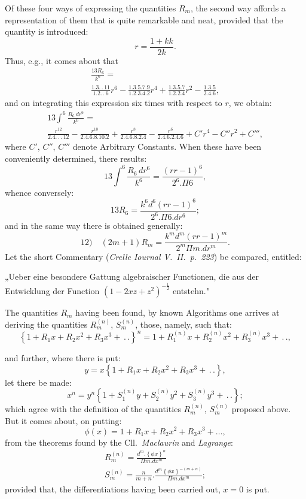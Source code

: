\documentclass{article}
\begin{document}
Of these four ways of expressing the quantities $R_{m}$, the second way affords a representation of them that is quite remarkable and neat, provided that the quantity is introduced:
\[
r=\frac{1+kk}{2k}.
\]
Thus, e.g., it comes about that
\[
\begin{gathered}
\frac{13R_{6}}{k^{6}}=\\[1.5ex]
\frac{1.3.\,.\,11}{1.2.\,.\,6}r^{6}-\frac{1.3.5.7.9}{1.2.3.4.2}r^{4}+\frac{1.3.5.7}{1.2.2.4}r^{2}-\frac{1.3.5}{2.4.6},
\end{gathered}
\]
and on integrating this expression six times with respect to $r$, we obtain:
\[
\begin{gathered}
13\int^{6}\frac{R_{6}\,dr^{6}}{k^{6}}=\\[1.5ex]
\frac{r^{12}}{2.4.\,.\,.\,12}-\frac{r^{10}}{2.4.6.8.10.2}+\frac{r^{8}}{2.4.6.8.2.4}-\frac{r^{6}}{2.4.6.2.4.6}+C'r^{4}-C''r^{2}+C''',
\end{gathered}
\]
where $C'$, $C''$, $C'''$ denote Arbitrary Constants. When these have been conveniently determined, there results:
\[
13\int^{6}\frac{R_{6}\,dr^{6}}{k^{6}}=\frac{(rr-1)^{6}}{2^{6}.\Pi 6},
\]
whence conversely:
\[
13R_{6}=\frac{k^{6}d^{6}(rr-1)^{6}}{2^{6}.\Pi 6.dr^{6}};
\]
and in the same way there is obtained generally:
\[
\text{12)}\quad(2m+1)R_{m}=\frac{k^{m}d^{m}(rr-1)^{m}}{2^{m}\Pi m.dr^{m}}.
\]
Let the short Commentary (\emph{Crelle Iournal V.\ II.\ p.\ 223}) be compared, entitled:

„Ueber eine besondere Gattung algebraischer Functionen, die aus der Entwicklung der Function $(1-2xz+z^{2})^{-\frac{1}{2}}$ entstehn."

The quantities $R_{m}$ having been found, by known Algorithms one arrives at deriving the quantities $R_{m}^{(n)}$, $S_{m}^{(n)}$, those, namely, such that:
\[
\left\{1+R_{1}x+R_{2}x^{2}+R_{3}x^{3}+\,.\,.\right\}^{n}=1+R_{1}^{(n)}x+R_{2}^{(n)}x^{2}+R_{3}^{(n)}x^{3}+\,.\,.,
\]

and further, where there is put:
\[
y=x\left\{1+R_{1}x+R_{2}x^{2}+R_{3}x^{3}+\,.\,.\right\},
\]
let there be made:
\[
x^{n}=y^{n}\left\{1+S_{1}^{(n)}y+S_{2}^{(n)}y^{2}+S_{3}^{(n)}y^{3}+\,.\,.\right\};
\]
which agree with the definition of the quantities $R_{m}^{(n)}$, $S_{m}^{(n)}$ proposed above. But it comes about, on putting:
\[
\phi(x)=1+R_{1}x+R_{2}x^{2}+R_{3}x^{3}+\ldots,
\]
from the theorems found by the Cll.\ \emph{Maclaurin} and \emph{Lagrange}:
\[
\begin{gathered}
R_{m}^{(n)}=\frac{d^{m}.\left\{\phi x\right\}^{n}}{\Pi m.dx^{m}}\\[1.5ex]
S_{m}^{(n)}=\frac{n}{m+n}.\frac{d^{m}\left\{\phi x\right\}^{-(m+n)}}{\Pi m.dx^{m}};
\end{gathered}
\]
provided that, the differentiations having been carried out, $x=0$ is put.
\end{document}
